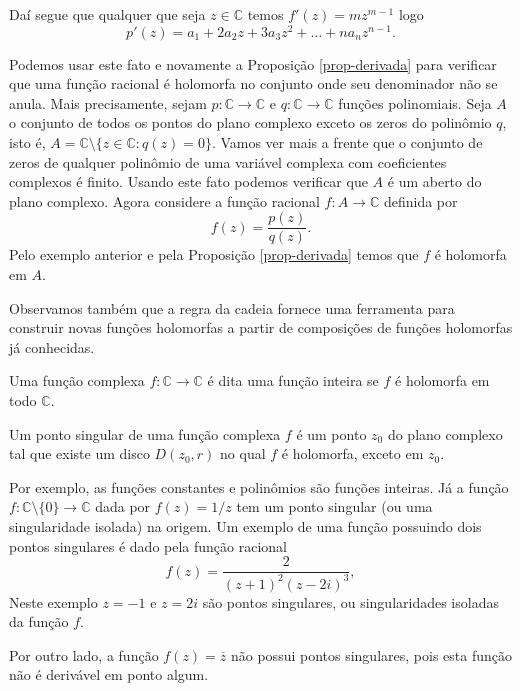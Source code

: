 Daí segue que qualquer que seja $z\in \mathbb{C}$ temos $f'(z)=mz^{m-1}$ logo
\[
p'(z) = a_1+2a_2z+3a_3z^2+\ldots +na_nz^{n-1}.
\]

Podemos usar este fato e novamente a Proposição \ref{prop-derivada} para verificar que 
uma função racional é holomorfa no conjunto onde seu denominador não se anula.
Mais precisamente, sejam $p:\mathbb{C}\to\mathbb{C}$ e $q:\mathbb{C}\to\mathbb{C}$ 
funções polinomiais. Seja $A$ o conjunto de todos os pontos do plano complexo 
exceto os zeros do polinômio $q$, isto é, 
$A=\mathbb{C}\setminus \{z\in \mathbb{C}: q(z)=0\}$. Vamos ver mais a frente
que o conjunto de zeros de qualquer polinômio de uma variável complexa com coeficientes
complexos é finito. Usando este fato podemos verificar que $A$ é um aberto do plano complexo. Agora 
considere a função racional $f:A\to\mathbb{C}$ definida por 
\[
f(z) =\frac{p(z)}{q(z)}.
\]
Pelo exemplo anterior e pela Proposição \ref{prop-derivada} temos que $f$ é holomorfa em $A$.

Observamos também que a regra da cadeia fornece uma ferramenta para construir novas funções 
holomorfas a partir de composições de funções holomorfas já conhecidas.


\begin{definicao}
\label{def-func-inteira}
Uma função complexa $f:\mathbb{C}\to\mathbb{C}$ é dita uma função inteira se $f$ é holomorfa em todo $\mathbb{C}$.	
\end{definicao}


\begin{definicao}
\label{def-singularidade}
Um ponto singular de uma função complexa $f$ é um ponto $z_0$ do plano complexo 
tal que existe um disco $D(z_0,r)$ no qual $f$ é holomorfa, exceto em $z_0$. 	
\end{definicao}


Por exemplo, as funções constantes e polinômios são funções inteiras.
Já a função $f:\mathbb{C}\setminus\{0\}\to \mathbb{C}$ dada por $f(z)=1/z$ 
tem um ponto singular (ou uma singularidade isolada) na origem. Um exemplo de uma função 
possuindo dois pontos singulares é dado pela função racional
\[
f(z) = \frac{2}{(z+1)^2(z-2i)^3},
\]
Neste exemplo $z=-1$ e $z=2i$ são pontos singulares, ou singularidades isoladas da função $f$.

Por outro lado, a função $f(z)=\overline{z}$ não possui pontos singulares, pois esta função 
não é derivável em ponto algum.


